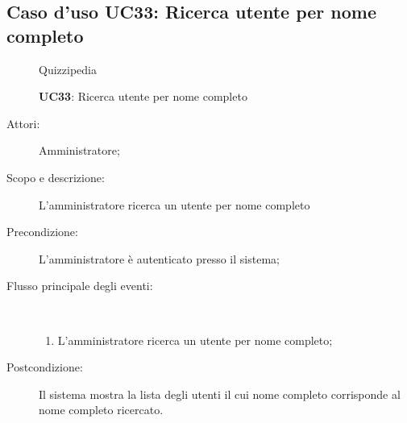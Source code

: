 \subsection{Caso d'uso UC33: Ricerca utente per nome completo}
	\begin{figure}[H]
		\centering
		\begin{resizedtikzpicture}{\textwidth}
		\begin{umlsystem}[x=0, fill=lightgray!20]{Quizzipedia}
		\end{umlsystem}
		\end{resizedtikzpicture}
		\caption{\textbf{UC33}: Ricerca utente per nome completo}
		\label{UC33}
	\end{figure}
\begin{description}
\item[Attori:] Amministratore;
\item[Scopo e descrizione:] L'amministratore ricerca un utente per nome completo
      \item[Precondizione:] L'amministratore è autenticato presso il sistema;

        \item[Flusso principale degli eventi:] \ 
 \begin{enumerate}
          \item L'amministratore ricerca un utente per nome completo;

      \end{enumerate}
    \item[Postcondizione:] Il sistema mostra la lista degli utenti il cui nome completo corrisponde al nome completo ricercato.
  \end{description}
\hypertarget{UC34}{}
